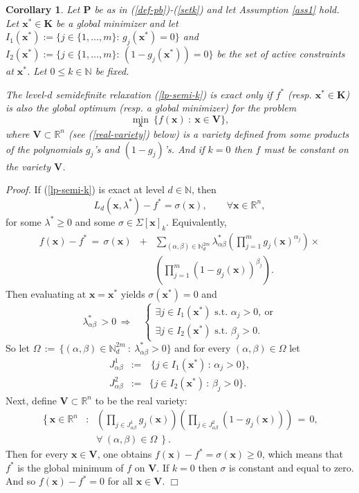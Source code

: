 \documentclass[11pt]{article}
\newtheorem{cor}{Corollary}[section]
\numberwithin{equation}{section}
\def\x{\mathbf{x}}
\def\R{\mathbb{R}}
\def\N{\mathbb{N}}
\def\K{\mathbf{K}}
\def\P{\mathbf{P}}
\def\V{\mathbf{V}}
\begin{document}
\begin{cor}
\label{badnews}
Let $\P$ be as in (\ref{def-pb})-(\ref{setk}) and let Assumption \ref{ass1} hold.
Let $\x^*\in\K$ be a global minimizer and let 
$I_1(\x^*):=\{j\in\{1,\ldots,m\}:\,g_j(\x^*)=0\}$ and
$I_2(\x^*):=\{j\in\{1,\ldots,m\}:\,(1-g_j(\x^*))=0\}$ 
be the set of active constraints at $\x^*$. Let $0\leq k\in\N$ be fixed.

The level-$d$ semidefinite relaxation (\ref{lp-semi-k}) is exact
only if $f^*$ (resp. $\x^*\in\K$) is also the global optimum (resp. a global minimizer) for the problem
\begin{equation}
\label{pb-variety}
\min_\x\:\{f(\x)\::\: \x\in \V\},\end{equation}
where $\V\subset\R^n$ (see (\ref{real-variety}) below) is a variety defined from 
some products of the polynomials $g_j$'s and $(1-g_j)$'s. 
And if $k=0$ then $f$ must be constant on the variety $\V$.
\end{cor}
{\it Proof.}
If (\ref{lp-semi-k}) is exact at level $d\in\N$, then
\[L_d(\x,\lambda^*)-f^*=\sigma(\x),\qquad\forall \x\in\R^n,\]
for some $\lambda^*\geq0$ and some $\sigma\in\Sigma[\x]_k$. Equivalently,
\begin{eqnarray*}
f(\x)-f^*\,=\,\sigma(\x)&+&\sum_{(\alpha,\beta)\in\N^{2m}_{d}}\lambda^*_{\alpha\beta}\left(\prod_{j=1}^mg_j(\x)^{\alpha_j}\right)\times\\
&&\left(\prod_{j=1}^m(1-g_j(\x))^{\beta_j}\right).\end{eqnarray*}
Then evaluating at $\x=\x^*$ yields $\sigma(\x^*)=0$ and 
\[\lambda^*_{\alpha\beta}\,>0\,\Rightarrow\quad\left\{\begin{array}{l}
\exists j\in I_1(\x^*)\mbox{ s.t. }\alpha_j>0,\:\mbox{or}\\
\exists j\in I_2(\x^*)\mbox{ s.t. }\beta_j>0.\end{array}\right.\]
So let $\Omega\,:=\,\{(\alpha,\beta)\in\N^{2m}_{d}\::\:\lambda^*_{\alpha\beta}>0\}$ and for every
$(\alpha,\beta)\in\Omega$ let
\begin{eqnarray*}
J^1_{\alpha\beta}&:=&\,\{j\in I_1(\x^*)\,:\,\alpha_j>0\},\\
J^2_{\alpha\beta}&:=&\{j\in I_2(\x^*)\,:\,\beta_j>0\}.\end{eqnarray*}
Next, define $\V\subset\R^n$ to be the real variety:
\begin{eqnarray}
\nonumber
\left\{\x\in\R^n\right.&:&
\left(\prod_{j\in J^1_{\alpha\beta}}g_j(\x)\right)
\left(\prod_{j\in J^2_{\alpha\beta}}(1-g_j(\x))\right)\,=\,0,\\
\label{real-variety}
&&\left.\forall\:(\alpha,\beta)\in\Omega\:\right\}.\end{eqnarray}
Then for every $\x\in\V$, one obtains $f(\x)-f^*=\sigma(\x)\geq0$, which means that
$f^*$ is the global minimum of $f$ on $\V$. If $k=0$ then $\sigma$ is constant and equal to zero.
And so $f(\x)-f^*=0$ for all $\x\in\V$.
$\Box$
\vspace{0.2cm}
\end{document}
